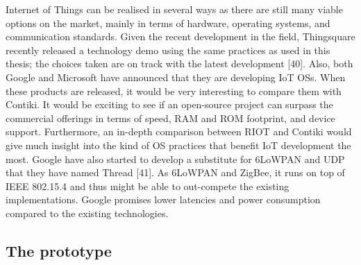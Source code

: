 
Internet of Things can be realised in several ways as there are still many viable options on the market,
	mainly in terms of hardware,
	operating systems,
	and communication standards.
Given the recent development in the field,
	Thingsquare recently released a technology demo using the same practices as used in this thesis;
	the choices taken are on track with the latest development [40].
Also,
	both Google and Microsoft have announced that they are developing IoT OSs.
When these products are released,
	it would be very interesting to compare them with Contiki.
It would be exciting to see if an open-source project can surpass the commercial offerings in terms of speed,
	RAM and ROM footprint,
	and device support.
Furthermore,
	an in-depth comparison between RIOT and Contiki would give much insight into the kind of OS practices that benefit IoT development the most.
Google have also started to develop a substitute for 6LoWPAN and UDP that they have named Thread [41].
As 6LoWPAN and ZigBee,
	it runs on top of IEEE 802.15.4 and thus might be able to out-compete the existing implementations.
Google promises lower latencies and power consumption compared to the existing technologies.

\subsection*{The prototype}

